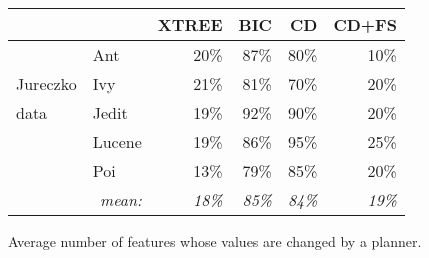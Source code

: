 \begin{figure}[!b]
\centering
{\small
\begin{tabular}{l|lrrrr}
  \hline
  \rowcolor{lightgray}
 &       & XTREE & BIC   & CD   &CD+FS \\\hline
&Ant    & 20\% & 87\% & 80\% & 10\%  \\
Jureczko&Ivy    & 21\% & 81\% & 70\% & 20\%  \\
data&Jedit  & 19\% & 92\% & 90\% & 20\%  \\
&Lucene & 19\% & 86\% & 95\% & 25\%  \\
&Poi    & 13\% & 79\% & 85\% & 20\%   \\\hline
\multicolumn{2}{r}{{\em mean:}}& {\em 18\%} & {\em 85\%} & {\em 84\%} & {\em 19\%}\\
\end{tabular}}
\noindent
\caption{Average number of features whose values are changed by a planner.}\label{fig:types}
\end{figure}